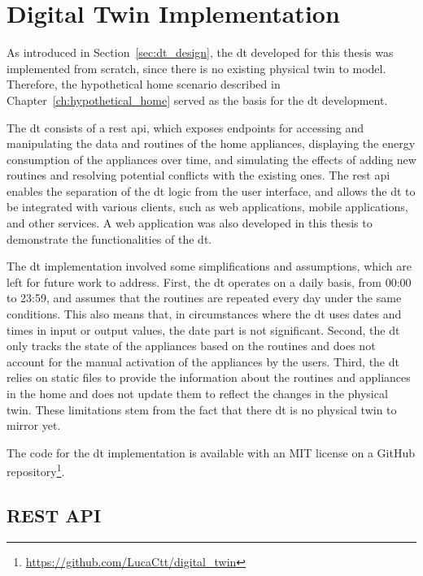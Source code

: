 \chapter{Digital Twin Implementation}\label{ch:implementation}

As introduced in Section~\ref{sec:dt_design}, the \acrshort{dt} developed for this thesis was implemented from scratch, since there is no existing physical twin to model. Therefore, the hypothetical home scenario described in Chapter~\ref{ch:hypothetical_home} served as the basis for the \acrshort{dt} development.

The \acrshort{dt} consists of a \acrfull{rest} \acrfull{api}, which exposes endpoints for accessing and manipulating the data and routines of the home appliances, displaying the energy consumption of the appliances over time, and simulating the effects of adding new routines and resolving potential conflicts with the existing ones. The \acrshort{rest} \acrshort{api} enables the separation of the \acrshort{dt} logic from the user interface, and allows the \acrshort{dt} to be integrated with various clients, such as web applications, mobile applications, and other services. A web application was also developed in this thesis to demonstrate the functionalities of the \acrshort{dt}.

The \acrshort{dt} implementation involved some simplifications and assumptions, which are left for future work to address. First, the \acrshort{dt} operates on a daily basis, from 00:00 to 23:59, and assumes that the routines are repeated every day under the same conditions. This also means that, in circumstances where the \acrshort{dt} uses dates and times in input or output values, the date part is not significant. Second, the \acrshort{dt} only tracks the state of the appliances based on the routines and does not account for the manual activation of the appliances by the users. Third, the \acrshort{dt} relies on static files to provide the information about the routines and appliances in the home and does not update them to reflect the changes in the physical twin. These limitations stem from the fact that there \acrshort{dt} is no physical twin to mirror yet.

The code for the \acrshort{dt} implementation is available with an MIT license on a GitHub repository\footnote{\url{https://github.com/LucaCtt/digital_twin}}.

\newpage

\section{REST API}

